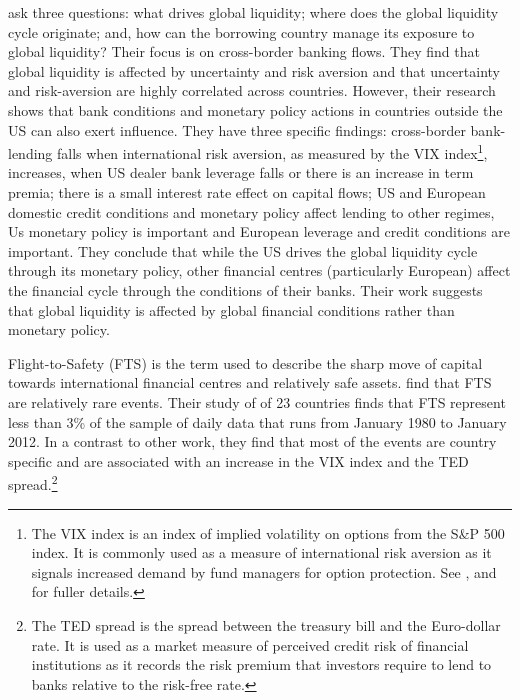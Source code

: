 \documentclass[12pt, a4paper, oneside]{article} %
\begin{document}
\citet{Cerutti2014} ask three questions:  what drives global liquidity; where does the global liquidity cycle originate; and, how can the borrowing country manage its exposure to global liquidity? Their focus is on cross-border banking flows. They find that global liquidity is affected by uncertainty and risk aversion and that uncertainty and risk-aversion are highly correlated across countries. However, their research shows that bank conditions and monetary policy actions in countries outside the US can also exert influence. They have three specific findings:  cross-border bank-lending falls when international risk aversion, as measured by the VIX index\footnote{The VIX index is an index of implied volatility on options from the S\&P 500 index.  It is commonly used as a measure of international risk aversion as it signals increased demand by fund managers for option protection.  See \citet{VIX}, \citet{GoldmanVo} and \citet{Diamond} for fuller details.}, increases, when US dealer bank leverage falls or there is an increase in term premia; there is a small interest rate effect on capital flows; US and European domestic credit conditions and monetary policy affect lending to other regimes, Us monetary policy is important and European leverage and credit conditions are important.  They conclude that while the US drives the global liquidity cycle through its monetary policy, other financial centres (particularly European) affect the financial cycle through the conditions of their banks. Their work suggests that global liquidity is affected by global financial conditions rather than monetary policy.

Flight-to-Safety (FTS) is the term used to describe the sharp move of capital towards international financial centres and relatively safe assets.\citet{FTS} find that FTS are relatively rare events. Their study of of 23 countries finds that FTS represent less than 3\% of the sample of daily data that runs from January 1980 to January 2012.  In a contrast to other work, they find that most of the events are country specific and are associated with an increase in the VIX index and the TED spread.\footnote{The TED spread is the spread between the treasury bill and the Euro-dollar rate.  It is used as a market measure of perceived credit risk of financial institutions as it records the risk premium that investors require to lend to banks relative to the risk-free rate.}   %
\end{document}
